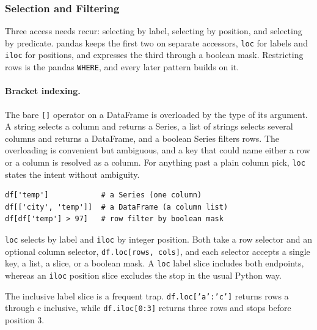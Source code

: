 \subsubsection{Selection and Filtering}

Three access needs recur: selecting by label, selecting by position, and selecting by predicate. pandas keeps the first two on separate accessors, \texttt{loc} for labels and \texttt{iloc} for positions, and expresses the third through a boolean mask. Restricting rows is the pandas \texttt{WHERE}, and every later pattern builds on it.

\paragraph{Bracket indexing.} The bare \texttt{[]} operator on a DataFrame is overloaded by the type of its argument. A string selects a column and returns a Series, a list of strings selects several columns and returns a DataFrame, and a boolean Series filters rows. The overloading is convenient but ambiguous, and a key that could name either a row or a column is resolved as a column. For anything past a plain column pick, \texttt{loc} states the intent without ambiguity.

\begin{lstlisting}[style=python, caption={The overloaded bracket}]
df['temp']            # a Series (one column)
df[['city', 'temp']]  # a DataFrame (a column list)
df[df['temp'] > 97]   # row filter by boolean mask
\end{lstlisting}

\vspace{-1ex}

\begin{definition}
\texttt{loc} selects by label and \texttt{iloc} by integer position. Both take a row selector and an optional column selector, \texttt{df.loc[rows, cols]}, and each selector accepts a single key, a list, a slice, or a boolean mask. A \texttt{loc} label slice includes both endpoints, whereas an \texttt{iloc} position slice excludes the stop in the usual Python way.
\end{definition}

The inclusive label slice is a frequent trap. \texttt{df.loc['a':'c']} returns rows a through c inclusive, while \texttt{df.iloc[0:3]} returns three rows and stops before position 3.


